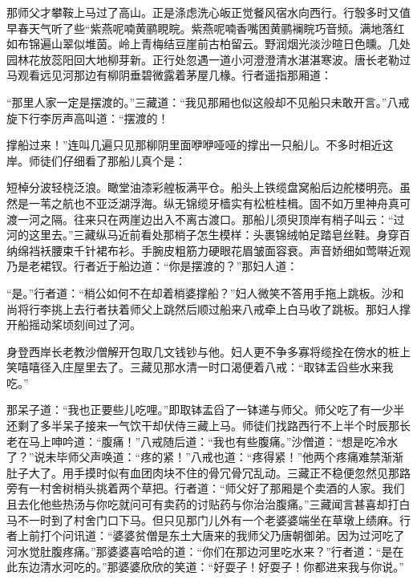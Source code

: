\documentclass[12pt,UTF8]{ctexbook}
\begin{document}
{那师父才攀鞍上马过了高山。正是涤虑洗心皈正觉餐风宿水向西行。行彀多时又值早春天气听了些“紫燕呢喃黄鹂睍睆。紫燕呢喃香嘴困黄鹂襕睆巧音频。满地落红如布锦遍山翠似堆茵。岭上青梅结豆崖前古柏留云。野润烟光淡沙暄日色曛。几处园林花放蕊阳回大地柳芽新。正行处忽遇一道小河澄澄清水湛湛寒波。唐长老勒过马观看远见河那边有柳阴垂碧微露着茅屋几椽。行者遥指那厢道：

“那里人家一定是摆渡的。”三藏道：“我见那厢也似这般却不见船只未敢开言。”八戒旋下行李厉声高叫道：“摆渡的！

撑船过来！”连叫几遍只见那柳阴里面咿咿哑哑的撑出一只船儿。不多时相近这岸。师徒们仔细看了那船儿真个是：

短棹分波轻桡泛浪。瞰堂油漆彩艎板满平仓。船头上铁缆盘窝船后边舵楼明亮。虽然是一苇之航也不亚泛湖浮海。纵无锦缆牙樯实有松桩桂楫。固不如万里神舟真可渡一河之隔。往来只在两崖边出入不离古渡口。那船儿须臾顶岸有梢子叫云：“过河的这里去。”三藏纵马近前看处那梢子怎生模样：头裹锦绒帕足踏皂丝鞋。身穿百纳绵裆袄腰束千针裙布衫。手腕皮粗筋力硬眼花眉皱面容衰。声音娇细如莺啭近观乃是老裙钗。行者近于船边道：“你是摆渡的？”那妇人道：

“是。”行者道：“梢公如何不在却着梢婆撑船？”妇人微笑不答用手拖上跳板。沙和尚将行李挑上去行者扶着师父上跳然后顺过船来八戒牵上白马收了跳板。那妇人撑开船摇动桨顷刻间过了河。

身登西岸长老教沙僧解开包取几文钱钞与他。妇人更不争多寡将缆拴在傍水的桩上笑嘻嘻径入庄屋里去了。三藏见那水清一时口渴便着八戒：“取钵盂舀些水来我吃。”

那呆子道：“我也正要些儿吃哩。”即取钵盂舀了一钵递与师父。师父吃了有一少半还剩了多半呆子接来一气饮干却伏侍三藏上马。师徒们找路西行不上半个时辰那长老在马上呻吟道：“腹痛！”八戒随后道：“我也有些腹痛。”沙僧道：“想是吃冷水了？”说未毕师父声唤道：“疼的紧！”八戒也道：“疼得紧！”他两个疼痛难禁渐渐肚子大了。用手摸时似有血团肉块不住的骨冗骨冗乱动。三藏正不稳便忽然见那路旁有一村舍树梢头挑着两个草把。行者道：“师父好了那厢是个卖酒的人家。我们且去化他些热汤与你吃就问可有卖药的讨贴药与你治治腹痛。”三藏闻言甚喜却打白马不一时到了村舍门口下马。但只见那门儿外有一个老婆婆端坐在草墩上绩麻。行者上前打个问讯道：“婆婆贫僧是东土大唐来的我师父乃唐朝御弟。因为过河吃了河水觉肚腹疼痛。”那婆婆喜哈哈的道：“你们在那边河里吃水来？”行者道：“是在此东边清水河吃的。”那婆婆欣欣的笑道：“好耍子！好耍子！你都进来我与你说。”

}
\end{document}
